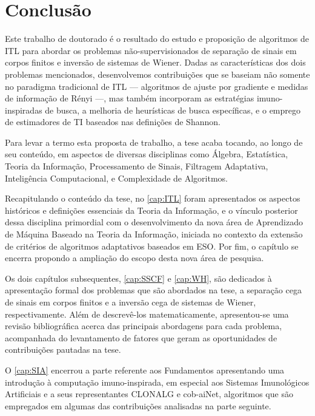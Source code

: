 \chapter*[Conclusão]{Conclusão}

Este trabalho de doutorado é o resultado do estudo e proposição de algoritmos de ITL para abordar os problemas não-supervisionados de separação de sinais em corpos finitos e inversão de sistemas de Wiener. Dadas as características dos dois problemas mencionados, desenvolvemos contribuições que se baseiam não somente no paradigma tradicional de ITL --- algoritmos de ajuste por gradiente e medidas de informação de Rényi ---, mas também incorporam as estratégias imuno-inspiradas de busca, a melhoria de heurísticas de busca específicas, e o emprego de estimadores de TI baseados nas definições de Shannon.

Para levar a termo esta proposta de trabalho, a tese acaba tocando, ao longo de seu conteúdo, em aspectos de diversas disciplinas como Álgebra, Estatística, Teoria da Informação, Processamento de Sinais, Filtragem Adaptativa, Inteligência Computacional, e Complexidade de Algoritmos.

Recapitulando o conteúdo da tese, no \autoref{cap:ITL} foram apresentados os aspectos históricos e definições essenciais da Teoria da Informação, e o vínculo posterior dessa disciplina primordial com o desenvolvimento da nova área de Aprendizado de Máquina Baseado na Teoria da Informação, iniciada no contexto da extensão de critérios de algoritmos adaptativos baseados em ESO. Por fim, o capítulo se encerra propondo a ampliação do escopo desta nova área de pesquisa.

Os dois capítulos subsequentes, \ref{cap:SSCF} e \ref{cap:WH}, são dedicados à apresentação formal dos problemas que são abordados na tese, a separação cega de sinais em corpos finitos e a inversão cega de sistemas de Wiener, respectivamente. Além de descrevê-los matematicamente, apresentou-se uma revisão bibliográfica acerca das principais abordagens para cada problema, acompanhada do levantamento de fatores que geram as oportunidades de contribuições pautadas na tese.

O \autoref{cap:SIA} encerrou a parte referente aos Fundamentos apresentando uma introdução à computação imuno-inspirada, em especial aos Sistemas Imunológicos Artificiais e a seus representantes CLONALG e cob-aiNet, algoritmos que são empregados em algumas das contribuições analisadas na parte seguinte.

